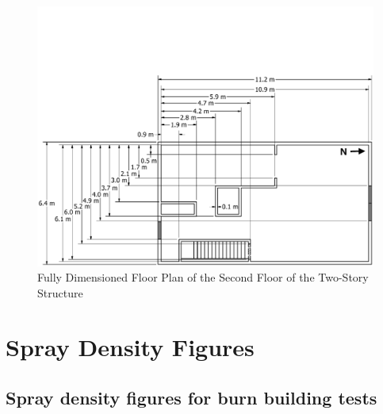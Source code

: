 \documentclass[12pt,oneside]{book}
\begin{document}
\begin{figure}[!ht]
	\includegraphics[width=\columnwidth]{../../DelCo_2014_2015/Drawings/PDFs/CAFS/West_Structure_2nd_Floor_Detailed}
	\caption{Fully Dimensioned Floor Plan of the Second Floor of the Two-Story Structure}
	\label{fig:dimensioned_second_2story_detailed}
\end{figure}

\chapter{Spray Density Figures}
\label{app:spray_density}

\section{Spray density figures for burn building tests}
\label{app:spray_bb}
\end{document}
